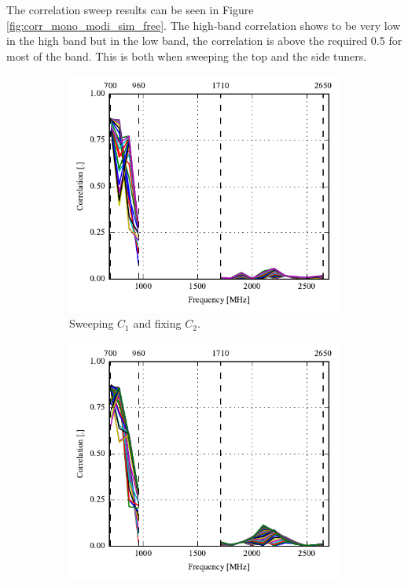 The correlation sweep results can be seen in Figure \ref{fig:corr_mono_modi_sim_free}. The high-band correlation shows to be very low in the high band but in the low band, the correlation is above the required 0.5 for most of the band. This is both when sweeping the top and the side tuners.

\begin{figure}[htbp]
    \centering
    \begin{subfigure}{0.49\linewidth}
      \includegraphics{img/tech_sol/monopole/highband/sim/corr_top.pdf}
        \caption{Sweeping $C_1$ and fixing $C_2$.}
    \end{subfigure}
    \hfill
    \begin{subfigure}{0.49\linewidth}
        \includegraphics{img/tech_sol/monopole/highband/sim/corr_side.pdf}

\end{subfigure}
\end{figure}
